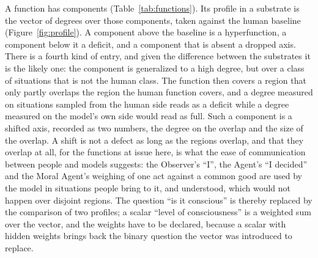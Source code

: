 A function has components (Table~\ref{tab:functions}). Its profile in a substrate is the vector of
degrees over those components, taken against the human baseline (Figure~\ref{fig:profile}). A
component above the baseline is a hyperfunction, a component below it a deficit, and a component that
is absent a dropped axis. There is a fourth kind of entry, and given the difference between the
substrates it is the likely one: the component is generalized to a high degree, but over a class of
situations that is not the human class. The function then covers a region that only partly overlaps
the region the human function covers, and a degree measured on situations sampled from the human side
reads as a deficit while a degree measured on the model's own side would read as full. Such a
component is a shifted axis, recorded as two numbers, the degree on the overlap and the size of the
overlap. A shift is not a defect as long as the regions overlap, and that they overlap at all, for the
functions at issue here, is what the ease of communication between people and models suggests: the
Observer's ``I'', the Agent's ``I decided'' and the Moral Agent's weighing of one act against a common
good are used by the model in situations people bring to it, and understood, which would not happen
over disjoint regions. The question ``is it conscious'' is thereby replaced by the comparison of two
profiles; a scalar ``level of consciousness'' is a weighted sum over the vector, and the weights have
to be declared, because a scalar with hidden weights brings back the binary question the vector was
introduced to replace.

